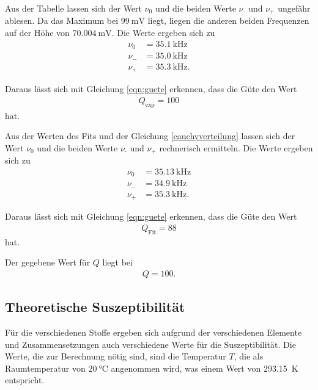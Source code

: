 \noindent Aus der Tabelle lassen sich der Wert $\nu_0$ und die beiden Werte $\nu_\text{-}$ und $\nu_\text{+}$ ungefähr ablesen.
Da das Maximum bei $\SI{99}{\milli\volt}$ liegt, liegen die anderen beiden Frequenzen auf der Höhe von $\SI{70.004}{\milli\volt}$.
Die Werte ergeben sich zu 
\begin{align*} 
 \nu_0 &= \SI{35.1}{\kilo\hertz} \\
 \nu_{-} &= \SI{35.0}{\kilo\hertz} \\
 \nu_{+} &= \SI{35.3}{\kilo\hertz}. 
\end{align*}

\noindent Daraus lässt sich mit Gleichung \eqref{eqn:guete} erkennen, dass die Güte den Wert 
\begin{align*} 
    Q_\text{exp} = \num{100}
\end{align*}
hat. 


\noindent Aus der Werten des Fits und der Gleichung \eqref{cauchyverteilung} lassen sich der Wert $\nu_0$ und die beiden Werte $\nu_\text{-}$ und $\nu_\text{+}$ rechnerisch ermitteln.
Die Werte ergeben sich zu 
\begin{align*} 
 \nu_0 &= \SI{35.13}{\kilo\hertz} \\
 \nu_{-} &= \SI{34.9}{\kilo\hertz} \\
 \nu_{+} &= \SI{35.3}{\kilo\hertz}. 
\end{align*}

\noindent Daraus lässt sich mit Gleichung \eqref{eqn:guete} erkennen, dass die Güte den Wert 
\begin{align*} 
    Q_\text{Fit} = \num{88}
\end{align*}
hat. 

\noindent Der gegebene Wert für $Q$ liegt bei 
\begin{align*} 
    Q = \num{100}.
\end{align*}


\subsection{Theoretische Suszeptibilität} 
Für die verschiedenen Stoffe ergeben sich aufgrund der verschiedenen Elemente und Zusammensetzungen auch verschiedene 
Werte für die Suszeptibilität. 
Die Werte, die zur Berechnung nötig sind, sind die Temperatur $T$, die als Raumtemperatur von $\SI{20}{\celsius}$ angenommen wird, was einem Wert von \SI{293.15}{\kelvin} entspricht. 


